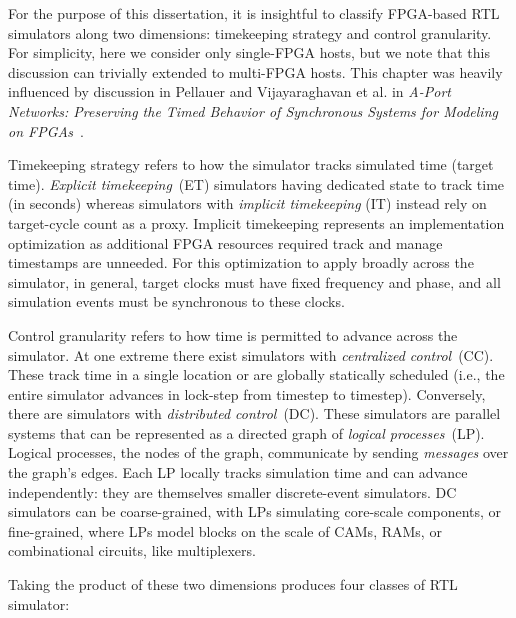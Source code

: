 
For the purpose of this dissertation, it is insightful to classify FPGA-based
RTL simulators along two dimensions: timekeeping strategy and control
granularity. For simplicity, here we consider only single-FPGA hosts, but we
note that this discussion can trivially extended to multi-FPGA hosts. This
chapter was heavily influenced by discussion in Pellauer and Vijayaraghavan et
al. in \emph{A-Port Networks: Preserving the Timed Behavior of Synchronous
Systems for Modeling on FPGAs}~\cite{APortNetworks}.

Timekeeping strategy refers to how the simulator tracks simulated time (target time). \emph{Explicit timekeeping}~(ET)
simulators having dedicated state to track time (in seconds) whereas simulators with \emph{implicit
timekeeping} (IT) instead rely on target-cycle count as a proxy. Implicit timekeeping represents an
implementation optimization as additional FPGA resources required track and
manage timestamps are unneeded. For this optimization to apply broadly across
the simulator, in general, target clocks must have fixed frequency and phase, and
all simulation events must be synchronous to these clocks.

Control granularity refers to how time is permitted to advance across the simulator. At one extreme there exist
simulators with \emph{centralized control}~(CC). These track time in
a single location or are globally statically scheduled (i.e., the entire simulator advances in lock-step from
timestep to timestep).  Conversely, there are simulators with \emph{distributed
control}~(DC). These simulators are parallel systems that can be represented as a directed graph of  \emph{logical
processes}~(LP). Logical processes, the nodes of the graph, communicate by sending \emph{messages} over the graph's edges.
Each LP locally tracks simulation time and can advance independently: they are themselves smaller discrete-event simulators. DC
simulators can be coarse-grained, with LPs simulating core-scale components, or
fine-grained, where LPs model blocks on the scale of CAMs, RAMs, or
combinational circuits, like multiplexers.

Taking the product of these two dimensions produces four classes of RTL simulator:


